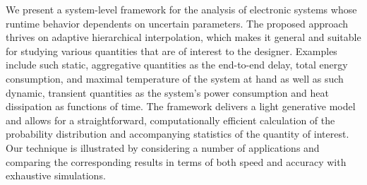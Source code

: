 We present a system-level framework for the analysis of electronic systems whose
runtime behavior dependents on uncertain parameters. The proposed approach
thrives on adaptive hierarchical interpolation, which makes it general and
suitable for studying various quantities that are of interest to the designer.
Examples include such static, aggregative quantities as the end-to-end delay,
total energy consumption, and maximal temperature of the system at hand as well
as such dynamic, transient quantities as the system's power consumption and heat
dissipation as functions of time. The framework delivers a light generative
model and allows for a straightforward, computationally efficient calculation of
the probability distribution and accompanying statistics of the quantity of
interest. Our technique is illustrated by considering a number of applications
and comparing the corresponding results in terms of both speed and accuracy with
exhaustive simulations.
